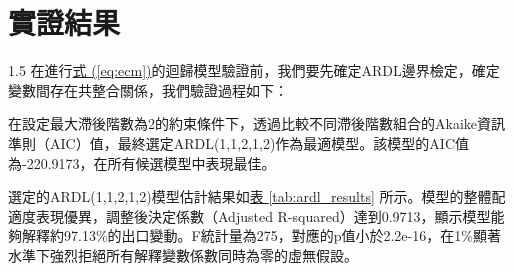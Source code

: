 \documentclass[a4paper,12pt]{article}
\begin{document}
\section{實證結果}
\begin{spacing}{1.5}
在進行\hspace{1pt}\hyperref[eq:ecm]{式 (\ref{eq:ecm})}的迴歸模型驗證前，我們要先確定ARDL邊界檢定，確定變數間存在共整合關係，我們驗證過程如下：

在設定最大滯後階數為2的約束條件下，透過比較不同滯後階數組合的Akaike資訊準則（AIC）值，最終選定ARDL(1,1,2,1,2)作為最適模型。該模型的AIC值為-220.9173，在所有候選模型中表現最佳。

選定的ARDL(1,1,2,1,2)模型估計結果如\hspace{1pt}\hyperref[tab:ardl_results]{表 \ref{tab:ardl_results}} 所示。模型的整體配適度表現優異，調整後決定係數（Adjusted R-squared）達到0.9713，顯示模型能夠解釋約97.13\%的出口變動。F統計量為275，對應的p值小於2.2e-16，在1\%顯著水準下強烈拒絕所有解釋變數係數同時為零的虛無假設。
\end{spacing}
\end{document}
